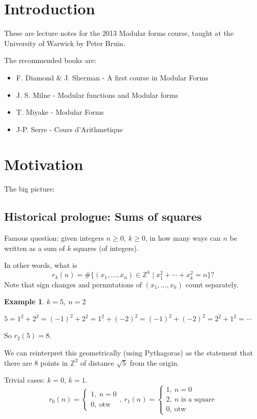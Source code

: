 \documentclass{article}
\theoremstyle{definition}
\newtheorem*{ex}{Example}
\begin{document}
\maketitle
\tableofcontents

\section{Introduction}
These are lecture notes for the 2013 Modular forms course, taught at the University of Warwick by Peter Bruin.


The recommended books are:
\begin{itemize}
\item F. Diamond \& J. Sherman - A first course in Modular Forms
\item J. S. Milne - Modular functions and Modular forms
\item T. Miyake - Modular Forms
\item J-P. Serre - Cours d'Arithmetique
\end{itemize}
\clearpage

\section{Motivation}
The big picture: %

\subsection{Historical prologue: Sums of squares}
Famous question: given integers $n \ge 0,\ k\ge 0$, in how many ways can $n$ be written as a sum of $k$ squares (of integers).

In other words, what is
\[
r_k(n) = \#\{(x_1,\ldots,x_n)\in \mathbb{Z}^k \mid x_1^2 + \cdots + x_k^2 = n\}?
\]
Note that sign changes and permutations of $(x_1,\ldots, x_k)$ count separately.

\begin{ex}
$k=5,\ n=2$

$5 = 1^2 + 2^2 = (-1)^2 + 2^2 = 1^2 + (-2)^2 = (-1)^2 + (-2)^2 = 2^2 + 1^2 = \cdots$

So $r_2(5) = 8$.

We can reinterpret this geometrically (using Pythagoras) as the statement that there are 8 points in $\mathbb{Z}^2$ of distance $\sqrt{5}$ from the origin.
\end{ex}

Trivial cases: $k=0$, $k=1$.
\[
r_0(n) = \begin{cases}
1,\ n=0 \\
0,\ \text{otw}
\end{cases},\ 
r_1(n) = \begin{cases}
1,\ n=0 \\
2,\ n\text{ is a square} \\
0,\ \text{otw}
\end{cases}
\]
\end{document}

